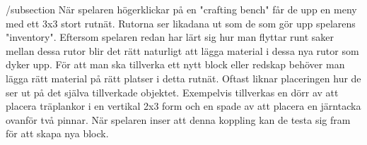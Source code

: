 
/subsection
När spelaren högerklickar på en "crafting bench" får de upp en meny med ett 3x3 stort rutnät. 
Rutorna ser likadana ut som de som gör upp spelarens "inventory". 
Eftersom spelaren redan har lärt sig hur man flyttar runt saker mellan dessa rutor blir det rätt naturligt att lägga material i dessa nya rutor som dyker upp. 
För att man ska tillverka ett nytt block eller redskap behöver man lägga rätt material på rätt platser i detta rutnät. 
Oftast liknar placeringen hur de ser ut på det själva tillverkade objektet. 
Exempelvis tillverkas en dörr av att placera träplankor i en vertikal 2x3 form och en spade av att placera en järntacka ovanför två pinnar. 
När spelaren inser att denna koppling kan de testa sig fram för att skapa nya block.